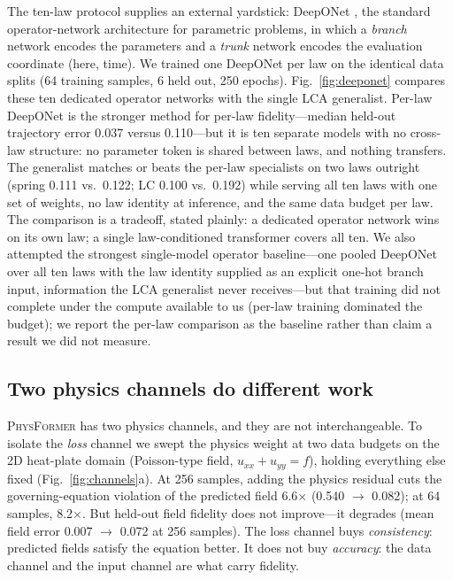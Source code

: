 \documentclass[11pt,a4paper]{article}
\newcommand{\PT}{{\scshape PhysFormer}}
\newcommand{\LCA}{{\scshape LCA}}
\begin{document}
The ten-law protocol supplies an external yardstick: DeepONet
\cite{lu2021deeponet}, the standard operator-network architecture for
parametric problems, in which a \emph{branch} network encodes the parameters
and a \emph{trunk} network encodes the evaluation coordinate (here, time).
We trained one DeepONet per law on the identical data splits (64 training
samples, 6 held out, 250 epochs). Fig.~\ref{fig:deeponet} compares these ten
dedicated operator networks with the single \LCA{} generalist. Per-law
DeepONet is the stronger method for per-law fidelity---median held-out
trajectory error 0.037 versus 0.110---but it is ten separate models with no
cross-law structure: no parameter token is shared between laws, and nothing
transfers. The generalist matches or beats the per-law specialists on two
laws outright (spring 0.111 vs.\ 0.122; LC 0.100 vs.\ 0.192) while serving
all ten laws with one set of weights, no law identity at inference, and the
same data budget per law. The comparison is a tradeoff, stated plainly: a
dedicated operator network wins on its own law; a single law-conditioned
transformer covers all ten. We also attempted the strongest single-model
operator baseline---one pooled DeepONet over all ten laws with the law
identity supplied as an explicit one-hot branch input, information the
\LCA{} generalist never receives---but that training did not complete under
the compute available to us (per-law training dominated the budget); we
report the per-law comparison as the baseline rather than claim a result we
did not measure.

\subsection{Two physics channels do different work}
\label{sec:channels}

\PT{} has two physics channels, and they are not interchangeable. To isolate
the \emph{loss} channel we swept the physics weight at two data budgets on
the 2D heat-plate domain (Poisson-type field, $u_{xx}+u_{yy} = f$), holding
everything else fixed (Fig.~\ref{fig:channels}a). At 256 samples, adding the
physics residual cuts the governing-equation violation of the predicted field
6.6$\times$ (0.540 $\to$ 0.082); at 64 samples, 8.2$\times$. But held-out
field fidelity does not improve---it degrades (mean field error 0.007 $\to$
0.072 at 256 samples). The loss channel buys \emph{consistency}: predicted
fields satisfy the equation better. It does not buy \emph{accuracy}: the data
channel and the input channel are what carry fidelity.
\end{document}
